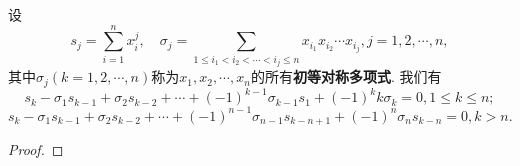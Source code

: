 \documentclass[../../main.tex]{subfiles}
\begin{document}
\begin{theorem}[Netwon公式]\label{theorem:Netwon公式}
设
\[
s_j = \sum_{i=1}^n x_i^j, \quad \sigma_j = \sum_{1 \leqslant i_1 < i_2 < \cdots < i_j \leqslant n} x_{i_1}x_{i_2} \cdots x_{i_j}, j = 1, 2, \cdots, n,
\]
其中$\sigma_j(k=1,2,\cdots,n)$称为$x_1,x_2,\cdots,x_n$的所有\textbf{初等对称多项式}.
我们有
\[
s_k - \sigma_1 s_{k - 1} + \sigma_2 s_{k - 2} + \cdots + (-1)^{k - 1} \sigma_{k - 1} s_1 + (-1)^k k \sigma_k = 0, 1 \leqslant k \leqslant n;
\]
\[
s_k - \sigma_1 s_{k - 1} + \sigma_2 s_{k - 2} + \cdots + (-1)^{n - 1} \sigma_{n - 1} s_{k - n + 1} + (-1)^n \sigma_n s_{k - n} = 0, k > n.
\]
\end{theorem}
\begin{proof}

\end{proof}
\end{document}
